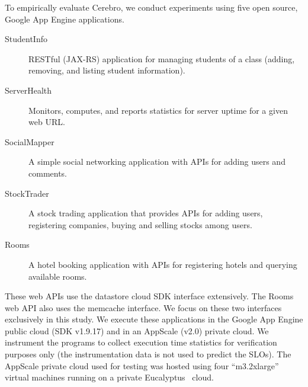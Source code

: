 To empirically evaluate Cerebro, we conduct experiments using five open source, Google
App Engine applications.

\begin{description}
\item[StudentInfo] RESTful (JAX-RS) application for managing
students of a class (adding, removing, and listing student information).
\item[ServerHealth] Monitors, computes, and reports statistics for server
uptime for a given web URL.
\item[SocialMapper] A simple social networking application with APIs for
adding users and comments.
\item[StockTrader] A stock trading application that
provides APIs for adding users, registering companies, buying and selling
stocks among users. 
\item[Rooms] A hotel booking application with APIs
for registering hotels and querying available rooms.
\end{description}

These web APIs use the datastore
cloud SDK interface extensively. The Rooms web API also uses the
memcache interface. We focus on these two interfaces exclusively in this
study. We execute these applications in the Google App Engine public cloud 
(SDK v1.9.17)
and in an AppScale (v2.0) private cloud.  We instrument the programs to collect
execution time statistics for verification purposes only 
(the instrumentation data is not used to predict
the SLOs).  The AppScale private cloud used for testing was
hosted using four ``m3.2xlarge'' virtual machines running on a private
Eucalyptus~\cite{eucalyptus09} cloud.




